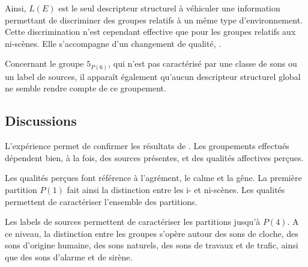 Ainsi, $L(E)$ est le seul descripteur structurel à véhiculer une information permettant de discriminer des groupes relatifs à un même type d'environnement. Cette discrimination n'est cependant effective que pour les groupes relatifs aux ni-scènes. Elle s'accompagne d'un changement de qualité,  .

Concernant le groupe $5_{P(6)}$, qui n'est pas caractérisé par une classe de sons ou un label de sources, il apparaît également qu'aucun descripteur structurel global ne semble rendre compte de ce groupement.



\subsection{Discussions}

L'expérience permet de confirmer les résultats de \citep{maffiolo_caracterisation_1999}. Les groupements effectués dépendent bien, à la fois, des sources présentes, et des qualités affectives perçues.

Les qualités perçues font référence à l'agrément, le calme et la gêne. La première partition $P(1)$ fait ainsi la distinction entre les i- et ni-scènes. Les qualités permettent de caractériser l'ensemble des partitions.

Les labels de sources permettent de caractériser les partitions jusqu'à $P(4)$. A ce niveau, la distinction entre les groupes s'opère autour des sons de cloche, des sons d'origine humaine, des sons naturels, des sons de travaux et de trafic, ainsi que des sons d'alarme et de sirène.

